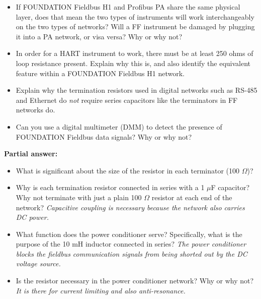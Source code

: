 \begin{itemize}
\item{} If FOUNDATION Fieldbus H1 and Profibus PA share the same physical layer, does that mean the two types of instruments will work interchangeably on the two types of networks?  Will a FF instrument be damaged by plugging it into a PA network, or visa versa?  Why or why not? 
\item{} In order for a HART instrument to work, there must be at least 250 ohms of loop resistance present.  Explain why this is, and also identify the equivalent feature within a FOUNDATION Fieldbus H1 network.
\item{} Explain why the termination resistors used in digital networks such as RS-485 and Ethernet do {\it not} require series capacitors like the terminators in FF networks do.
\item{} Can you use a digital multimeter (DMM) to detect the presence of FOUNDATION Fieldbus data signals?  Why or why not?
\end{itemize}







\noindent
{\bf Partial answer:}

\begin{itemize}
\item{} What is significant about the size of the resistor in each terminator (100 $\Omega$)?
\vskip 10pt
\item{} Why is each termination resistor connected in series with a 1 $\mu$F capacitor?  Why not terminate with just a plain 100 $\Omega$ resistor at each end of the network? {\it Capacitive coupling is necessary because the network also carries DC power.}
\vskip 10pt
\item{} What function does the power conditioner serve?  Specifically, what is the purpose of the 10 mH inductor connected in series?  {\it The power conditioner blocks the fieldbus communication signals from being shorted out by the DC voltage source.}
\vskip 10pt
\item{} Is the resistor necessary in the power conditioner network?  Why or why not? {\it It is there for current limiting and also anti-resonance.}
\vskip 10pt
\end{itemize}






